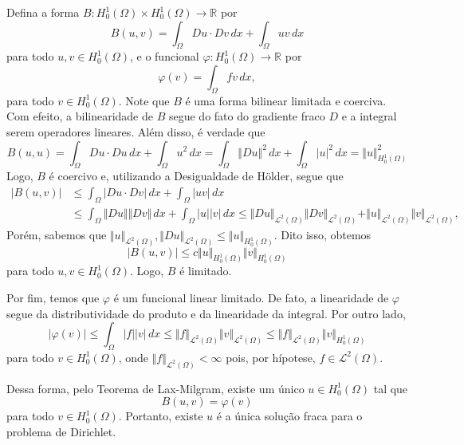 \documentclass[a4paper, 11pt]{book}
\theoremstyle{definition}
\newcommand{\bR}{\mathbb{R}}
\newcommand{\cL}{\mathcal{L}}
\begin{document}
Defina a forma $B : H^1_0(\Omega) \times H^1_0(\Omega) \to \bR$ por
\[
    B(u,v)=\int_\Omega Du \cdot Dv \,dx + \int_{\Omega} uv \,dx
\]
para todo $u, v \in H^1_0(\Omega)$,
e o funcional $\varphi : H^1_0(\Omega) \to \bR$ por
\[
    \varphi(v) = \int_\Omega fv \,dx,
\]
para todo $v \in H^1_0(\Omega)$.
Note que $B$ é uma forma bilinear limitada e coerciva. Com efeito, a bilinearidade de $B$ segue do fato do gradiente fraco $D$ e a integral serem operadores lineares. Além disso, é verdade que
\[
    B(u,u) = \int_\Omega Du \cdot Du \,dx + \int_\Omega u^2 \,dx
    = \int_\Omega \Vert Du \Vert^2 \,dx + \int_\Omega |u|^2 \,dx 
    = \Vert u \Vert_{H^1_0(\Omega)}^2
\]
Logo, $B$ é coercivo e, utilizando a Desigualdade de Hölder, segue que
\[
    \begin{aligned}
        |B(u,v)| &\leqslant \int_\Omega |Du \cdot Dv | \,dx + \int_\Omega |u v | \,dx\\ &\leqslant \int_\Omega \Vert Du \Vert \Vert Dv \Vert \,dx + \int_\Omega |u| |v| \,dx \leqslant \Vert Du \Vert_{\cL^2(\Omega)}\Vert Dv \Vert_{\cL^2(\Omega)} + \Vert u \Vert_{\cL^2(\Omega)}\Vert v \Vert_{\cL^2(\Omega)},
    \end{aligned}
\]
Porém, sabemos que $\Vert u \Vert_{\cL^2(\Omega)}, \Vert Du \Vert_{\cL^2(\Omega)} \leqslant \Vert u \Vert_{H^1_0(\Omega)}$.
Dito isso, obtemos
\[
    |B(u,v)| \leqslant c \Vert u \Vert_{H^1_0(\Omega)} \Vert v \Vert_{H^1_0(\Omega)}
\]
para todo $u, v \in H^1_0(\Omega)$. Logo, $B$ é limitado.

Por fim, temos que $\varphi$ é um funcional linear limitado.
De fato, a linearidade de $\varphi$ segue da distributividade do produto e da linearidade da integral.
Por outro lado,
\[
    |\varphi(v)| \leqslant \int_\Omega |f| |v| \,dx \leqslant \Vert f \Vert_{\cL^2(\Omega)} \Vert v \Vert_{\cL^2(\Omega)} \leqslant \Vert f \Vert_{\cL^2(\Omega)} \Vert v \Vert_{H^1_0(\Omega)}
\]
para todo $v \in H^1_0(\Omega)$, onde $\Vert f \Vert_{\cL^2(\Omega)} < \infty$ pois, por hípotese, $f \in \cL^2(\Omega)$.

Dessa forma, pelo Teorema de Lax-Milgram, existe um único $u \in H^1_0(\Omega)$ tal que
\[
    B(u,v) = \varphi(v)
\]
para todo $v \in H^1_0(\Omega)$.
Portanto, existe $u$ é a única solução fraca para o problema de Dirichlet.

\nocite{*}
\printbibliography
\end{document}
